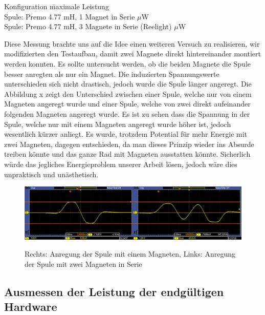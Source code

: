 \begin{tabbing}
    Konfiguration   \quad\= maximale Leistung    \\[0.8ex]
    Spule: Premo 4.77 mH, 1 Magnet in Serie         $\mu$W\\
	Spule: Premo 4.77 mH, 3 Magnete in Serie (Reelight)         $\mu$W\\	
\end{tabbing} %


Diese Messung brachte uns auf die Idee einen weiteren Versuch zu realisieren, wir modifizierten den Testaufbau, damit zwei Magnete direkt hintereinander montiert werden konnten. Es sollte untersucht werden, ob die beiden Magnete die Spule besser anregten als nur ein Magnet. Die induzierten Spannungswerte unterschieden sich nicht drastisch, jedoch wurde die Spule länger angeregt. Die Abbildung x zeigt den Unterschied zwischen einer Spule, welche nur von einem Magneten angeregt wurde und einer Spule, welche von zwei direkt aufeinander folgenden Magneten angeregt wurde. Es ist zu sehen dass die Spannung in der Spule, welche nur mit einem Magneten angeregt wurde höher ist, jedoch wesentlich kürzer anliegt. Es wurde, trotzdem Potential für mehr Energie mit zwei Magneten, dagegen entschieden, da man dieses Prinzip wieder ins Absurde treiben könnte und das ganze Rad mit Magneten ausstatten könnte. Sicherlich würde das jegliches Energieproblem unserer Arbeit lösen, jedoch wäre dies unpraktisch und unästhetisch.

\begin{figure}[ht]
  \includegraphics[width=1.0\textwidth]{3Vorgehen/imag/zweiMagneteInSerie.png}
  \label{zweiMagneteInSerie} 
  \caption{Rechts: Anregung der Spule mit einem Magneten, Links: Anregung der Spule mit zwei Magneten in Serie}
\end{figure}


\subsection{Ausmessen der Leistung der endgültigen Hardware}

